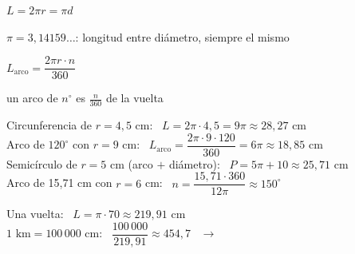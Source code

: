 \documentclass[11pt,a4paper]{article}
\begin{document}
\vfill
\begin{tcbraster}[raster columns=2,raster equal height,raster column skip=10pt]
\begin{tcolorbox}[enhanced,colback=fmyellow!18,colframe=fmgold,arc=4mm,boxrule=1.6pt,before upper=\centering]
{\Large$L=2\pi r=\pi d$}\par\smallskip
{\small $\pi=3{,}14159\dots$: longitud entre diámetro, siempre el mismo}
\end{tcolorbox}
\begin{tcolorbox}[enhanced,colback=fmyellow!18,colframe=fmgold,arc=4mm,boxrule=1.6pt,before upper=\centering]
{\Large$L_{\text{arco}}=\dfrac{2\pi r\cdot n}{360}$}\par\smallskip
{\small un arco de $n^\circ$ es $\frac{n}{360}$ de la vuelta}
\end{tcolorbox}
\end{tcbraster}

\vfill
\begin{exemple}[Ejemplos]
Circunferencia de $r=4{,}5$ cm: \ $L=2\pi\cdot4{,}5=9\pi\approx\boxed{28{,}27\text{ cm}}$\\[5pt]
Arco de $120^\circ$ con $r=9$ cm: \ $L_{\text{arco}}=\dfrac{2\pi\cdot9\cdot120}{360}=6\pi\approx\boxed{18{,}85\text{ cm}}$\\[5pt]
Semicírculo de $r=5$ cm (arco $+$ diámetro): \ $P=5\pi+10\approx\boxed{25{,}71\text{ cm}}$\\[5pt]
Arco de 15,71 cm con $r=6$ cm: \ $n=\dfrac{15{,}71\cdot360}{12\pi}\approx\boxed{150^\circ}$
\end{exemple}

\vfill
\begin{exemple}
\begin{minipage}[c]{0.2\linewidth}\centering
{}
\end{minipage}\hfill
\begin{minipage}[c]{0.77\linewidth}
Una vuelta: \ $L=\pi\cdot70\approx219{,}91$ cm\\[3pt]
$1\text{ km}=100\,000$ cm: \ $\dfrac{100\,000}{219{,}91}\approx454{,}7$ \ $\to$ \ 
\end{minipage}
\end{exemple}
\end{document}
